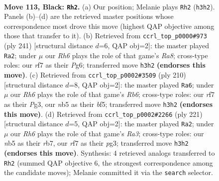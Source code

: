 \documentclass[11pt]{article}
\begin{document}
\clearpage

\begin{figure}[p]\centering
\begin{subfigure}{0.46\textwidth}\centering
\resizebox{\linewidth}{!}{%
\newchessgame
\chessboard[
  setfen={8/5R2/8/1N1k2K1/6P1/7r/8/8 b - - 10 113},
  showmover=false,
  pgfstyle=straightmove, color=movearrow, markmove={h3-h2}
]}
\caption{}
\end{subfigure}\hfill
\begin{subfigure}{0.46\textwidth}\centering
\resizebox{\linewidth}{!}{%
\newchessgame
\chessboard[
  setfen={8/8/6p1/8/6k1/8/4NPK1/r7 b - - 67 121},
  showmover=false,
  pgfstyle=straightmove, color=movearrow, markmove={a1-a2}
]}
\caption{}
\end{subfigure}
\\[4pt]
\begin{subfigure}{0.46\textwidth}\centering
\resizebox{\linewidth}{!}{%
\newchessgame
\chessboard[
  setfen={8/5pk1/1R6/5b2/8/4K1P1/8/8 w - - 83 106},
  showmover=false,
  pgfstyle=straightmove, color=movearrow, markmove={b6-a6}
]}
\caption{}
\end{subfigure}\hfill
\begin{subfigure}{0.46\textwidth}\centering
\resizebox{\linewidth}{!}{%
\newchessgame
\chessboard[
  setfen={6k1/1R6/r7/5KP1/8/6P1/8/8 b - - 18 111},
  showmover=false,
  pgfstyle=straightmove, color=movearrow, markmove={a6-a2}
]}
\caption{}
\end{subfigure}
\caption{\textbf{Move 113, Black: \texttt{Rh2}.} (a) Our position; Melanie plays \texttt{Rh2} (\texttt{h3h2}). Panels (b)--(d) are the retrieved master positions whose correspondence most drove this move (highest QAP objective among those that transfer to it). (b) Retrieved from \texttt{ccrl\_top\_p0000\#973} (ply 241) [structural distance $d$=6, QAP obj=2]: the master played \texttt{Ra2}; under $\mu$ our \emph{Rh6} plays the role of that game's \emph{Ra8}; cross-type roles: our \emph{r}f7 as their \emph{P}g6; transferred move \texttt{h3h2} \textbf{(endorses this move)}. (c) Retrieved from \texttt{ccrl\_top\_p0002\#3509} (ply 210) [structural distance $d$=8, QAP obj=2]: the master played \texttt{Ra6}; under $\mu$ our \emph{Rh6} plays the role of that game's \emph{Rb6}; cross-type roles: our \emph{r}f7 as their \emph{P}g3, our \emph{n}b5 as their \emph{b}f5; transferred move \texttt{h3h2} \textbf{(endorses this move)}. (d) Retrieved from \texttt{ccrl\_top\_p0002\#2266} (ply 221) [structural distance $d$=5, QAP obj=2]: the master played \texttt{Ra2}; under $\mu$ our \emph{Rh6} plays the role of that game's \emph{Ra3}; cross-type roles: our \emph{n}b5 as their \emph{r}b7, our \emph{r}f7 as their \emph{p}g3; transferred move \texttt{h3h2} \textbf{(endorses this move)}. Synthesis: 4 retrieved analogs transferred to \texttt{Rh2} (summed QAP objective 6, the strongest correspondence among the candidate moves); Melanie committed it via the \texttt{search} selector.}
\label{fig:thought-m225}
\end{figure}
\end{document}
